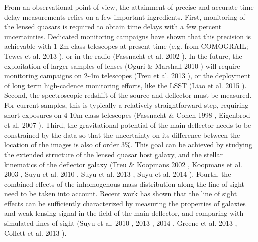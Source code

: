 \documentclass[a4paper,11pt]{article}
\begin{document}
From an observational point of view, the attainment of precise and
accurate time delay measurements relies on a few important
ingredients. First, monitoring of the lensed quasars is required to
obtain time delays with a few percent uncertainties. Dedicated
monitoring campaigns have shown that this precision is achievable with
1-2m class telescopes at present time (e.g. from COMOGRAIL; Tewes et
al. 2013 \citep{2013A&A...556A..22T}), or in the radio (Fassnacht et
al. 2002 \citep{2002ApJ...581..823F}). In the future, the exploitation
of larger samples of lenses (Oguri \& Marshall 2010
\cite{2010MNRAS.405.2579O}) will require monitoring campaigns on 2-4m
telescopes (Treu et al. 2013 \citep{2013arXiv1306.1272T}), or the
deployment of long term high-cadence monitoring efforts, like the LSST
(Liao et al. 2015 \citep{2015ApJ...800...11L}). Second, the
spectroscopic redshift of the source and deflector must be measured.
For current samples, this is typically a relatively straightforward
step, requiring short exposures on 4-10m class telescopes (Fassnacht \&
Cohen 1998 \citep{1998AJ....115..377F}, Eigenbrod et al. 2007
\citep{2007A&A...465...51E}).  Third, the gravitational potential of
the main deflector needs to be constrained by the data so that the
uncertainty on its difference between the location of the images is
also of order 3\%. This goal can be achieved by studying the extended
structure of the lensed quasar host galaxy, and the stellar kinematics
of the deflector galaxy (Treu \& Koopmans 2002
\citep{2002MNRAS.337L...6T}, Koopmans et al. 2003
\citep{2003ApJ...599...70K}, Suyu et al. 2010
\citep{2010ApJ...711..201S}, Suyu et al. 2013
\citep{2013ApJ...766...70S}, Suyu et al. 2014
\cite{2014ApJ...788L..35S}).  Fourth, the combined effects of the
inhomogenous mass distribution along the line of sight need to be
taken into account. Recent work has shown that the line of sight
effects can be sufficiently characterized by measuring the properties
of galaxies and weak lensing signal in the field of the main
deflector, and comparing with simulated lines of sight (Suyu et al.
2010 \citep{2010ApJ...711..201S}, 2013 \citep{2013ApJ...766...70S},
2014 \citep{2014ApJ...788L..35S}, Greene et al. 2013
\citep{2013ApJ...768...39G}, Collett et al. 2013
\citep{2013MNRAS.432..679C}).
\end{document}
